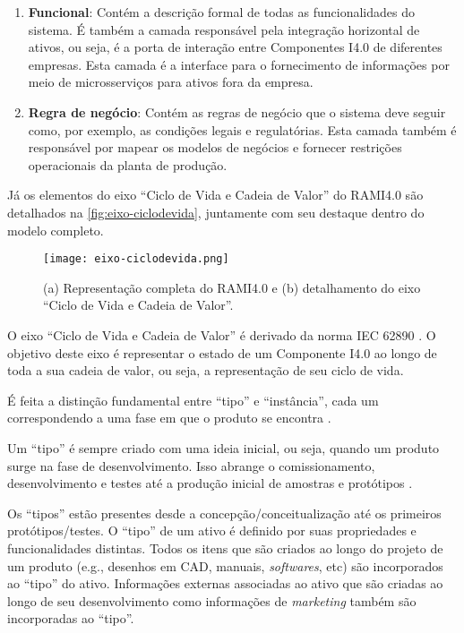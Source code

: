 \begin{enumerate}
	\item \textbf{Funcional}: Contém a descrição formal de todas as funcionalidades do sistema. É também a camada responsável pela integração horizontal de ativos, ou seja, é a porta de interação entre Componentes I4.0 de diferentes empresas. Esta camada é a interface para o fornecimento de informações por meio de microsserviços para ativos fora da empresa.

	\item \textbf{Regra de negócio}: Contém as regras de negócio que o sistema deve seguir como, por exemplo, as condições legais e regulatórias. Esta camada também é responsável por mapear os modelos de negócios e fornecer restrições operacionais da planta de produção.
\end{enumerate}

Já os elementos do eixo ``Ciclo de Vida e Cadeia de Valor'' do RAMI4.0 são detalhados na \autoref{fig:eixo-ciclodevida}, juntamente com seu destaque dentro do modelo completo.

\begin{figure}[htb]
	\centering
	\texttt{[image: eixo-ciclodevida.png]}
	\caption{(a) Representação completa do RAMI4.0 e (b) detalhamento do eixo ``Ciclo de Vida e Cadeia de Valor''.}
	\label{fig:eixo-ciclodevida}
\end{figure}

O eixo ``Ciclo de Vida e Cadeia de Valor'' é derivado da norma IEC 62890 \cite{adolphs2015rami}. O objetivo deste eixo é representar o estado de um Componente I4.0 ao longo de toda a sua cadeia de valor, ou seja, a representação de seu ciclo de vida.

É feita a distinção fundamental entre ``tipo'' e ``instância'', cada um correspondendo a uma fase em que o produto se encontra \cite{adolphs2015rami}.

Um ``tipo'' é sempre criado com uma ideia inicial, ou seja, quando um produto surge na fase de desenvolvimento. Isso abrange o comissionamento, desenvolvimento e testes até a produção inicial de amostras e protótipos \cite{adolph2018roadmap}.

Os ``tipos'' estão presentes desde a concepção/conceitualização até os primeiros protótipos/testes. O ``tipo'' de um ativo é definido por suas propriedades e funcionalidades distintas. Todos os itens que são criados ao longo do projeto de um produto (e.g., desenhos em CAD, manuais, \textit{softwares}, etc) são incorporados ao ``tipo'' do ativo. Informações externas associadas ao ativo que são criadas ao longo de seu desenvolvimento como informações de \textit{marketing} também são incorporadas ao ``tipo''.

